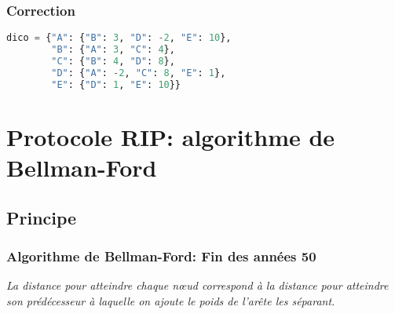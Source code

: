 \documentclass[svgnames,11pt]{beamer}
\begin{document}
\begin{frame}[fragile]
    \frametitle{Correction}

    \begin{center}
    \end{center}
    \begin{center}
    \begin{lstlisting}[language=Python]
        dico = {"A": {"B": 3, "D": -2, "E": 10},
        "B": {"A": 3, "C": 4},
        "C": {"B": 4, "D": 8},
        "D": {"A": -2, "C": 8, "E": 1},
        "E": {"D": 1, "E": 10}}
    \end{lstlisting}
    \end{center}

\end{frame}

\section{Protocole RIP: algorithme de Bellman-Ford}
\subsection{Principe}
\begin{frame}
    \frametitle{Algorithme de Bellman-Ford: Fin des années 50}

    \begin{center}
        \emph{La distance pour atteindre chaque nœud correspond à la distance pour atteindre son prédécesseur à laquelle on ajoute le poids de l'arête les séparant.}
    \end{center}

\end{frame}
\end{document}
